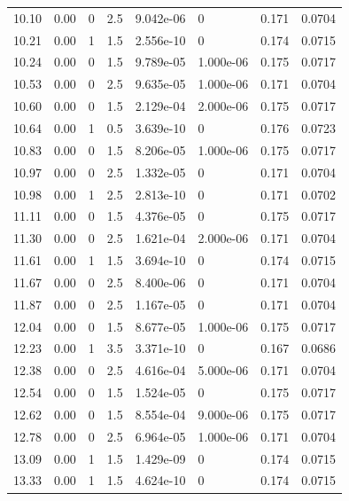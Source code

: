 \documentclass[preview]{standalone}
\begin{document}
{{{\begin{tabular}{L{1.2cm}C{1.2cm} C{0.3cm}C{0.5cm} C{1.4cm}C{1.4cm} C{1.4cm}C{1.4cm}}
  10.10  &  0.00  & 0     & 2.5 &  9.042e-06  & 0  & 0.171 &  0.0704   \\ 
  10.21  &  0.00  & 1     & 1.5 &  2.556e-10  & 0  & 0.174 &  0.0715   \\ 
  10.24  &  0.00  & 0     & 1.5 &  9.789e-05  & 1.000e-06  & 0.175 &  0.0717   \\ 
  10.53  &  0.00  & 0     & 2.5 &  9.635e-05  & 1.000e-06  & 0.171 &  0.0704   \\ 
  10.60  &  0.00  & 0     & 1.5 &  2.129e-04  & 2.000e-06  & 0.175 &  0.0717   \\ 
  10.64  &  0.00  & 1     & 0.5 &  3.639e-10  & 0  & 0.176 &  0.0723   \\ 
  10.83  &  0.00  & 0     & 1.5 &  8.206e-05  & 1.000e-06  & 0.175 &  0.0717   \\ 
  10.97  &  0.00  & 0     & 2.5 &  1.332e-05  & 0  & 0.171 &  0.0704   \\ 
  10.98  &  0.00  & 1     & 2.5 &  2.813e-10  & 0  & 0.171 &  0.0702   \\ 
  11.11  &  0.00  & 0     & 1.5 &  4.376e-05  & 0  & 0.175 &  0.0717   \\ 
  11.30  &  0.00  & 0     & 2.5 &  1.621e-04  & 2.000e-06  & 0.171 &  0.0704   \\ 
  11.61  &  0.00  & 1     & 1.5 &  3.694e-10  & 0  & 0.174 &  0.0715   \\ 
  11.67  &  0.00  & 0     & 2.5 &  8.400e-06  & 0  & 0.171 &  0.0704   \\ 
  11.87  &  0.00  & 0     & 2.5 &  1.167e-05  & 0  & 0.171 &  0.0704   \\ 
  12.04  &  0.00  & 0     & 1.5 &  8.677e-05  & 1.000e-06  & 0.175 &  0.0717   \\ 
  12.23  &  0.00  & 1     & 3.5 &  3.371e-10  & 0  & 0.167 &  0.0686   \\ 
  12.38  &  0.00  & 0     & 2.5 &  4.616e-04  & 5.000e-06  & 0.171 &  0.0704   \\ 
  12.54  &  0.00  & 0     & 1.5 &  1.524e-05  & 0  & 0.175 &  0.0717   \\ 
  12.62  &  0.00  & 0     & 1.5 &  8.554e-04  & 9.000e-06  & 0.175 &  0.0717   \\ 
  12.78  &  0.00  & 0     & 2.5 &  6.964e-05  & 1.000e-06  & 0.171 &  0.0704   \\ 
  13.09  &  0.00  & 1     & 1.5 &  1.429e-09  & 0  & 0.174 &  0.0715   \\ 
  13.33  &  0.00  & 1     & 1.5 &  4.624e-10  & 0  & 0.174 &  0.0715   \\ 

\end{tabular}}}}
\end{document}
